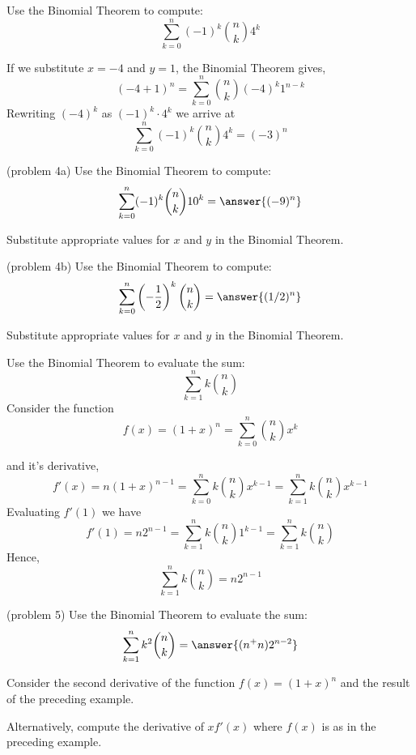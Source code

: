 \documentclass[handout]{ximera}
\begin{document}
\begin{example}[example 4]
Use the Binomial Theorem to compute:
\[
\sum_{k=0}^n (-1)^k\binom{n}{k}4^k 
\]

If we substitute $x=-4$ and $y=1$, the Binomial Theorem gives,
\[
(-4+1)^n = \sum_{k=0}^n \binom{n}{k} (-4)^k 1^{n-k}
\]
Rewriting $(-4)^k$ as $(-1)^k \cdot 4^k$ we arrive at
\[
\sum_{k=0}^n (-1)^k\binom{n}{k}4^k = (-3)^n
\]
\end{example}

\begin{problem}(problem 4a)
Use the Binomial Theorem to compute:
\[
\sum_{k=0}^n (-1)^k\binom{n}{k}10^k = \answer{(-9)^n}
\]
\begin{hint}
Substitute appropriate values for $x$ and $y$ in the Binomial Theorem.
\end{hint}

\end{problem}

\begin{problem}(problem 4b)
Use the Binomial Theorem to compute:
\[
\sum_{k=0}^n \left(-\frac12\right)^k\binom{n}{k} = \answer{(1/2)^n}
\]
\begin{hint}
Substitute appropriate values for $x$ and $y$ in the Binomial Theorem.
\end{hint}

\end{problem}

\begin{example}[example 5]
Use the Binomial Theorem to evaluate the sum:
\[
\sum_{k=1}^{n} k\binom{n}{k}
\]
Consider the function 
\[
f(x) = (1+x)^n =\sum_{k=0}^n \binom{n}{k} x^k
\]

and it's derivative, 
\[
f'(x) = n(1+x)^{n-1}= \sum_{k=0}^n k\binom{n}{k} x^{k-1} = \sum_{k=1}^n k\binom{n}{k} x^{k-1}
\]
Evaluating $f'(1)$ we have
\[
f'(1) = n2^{n-1} = \sum_{k=1}^n k\binom{n}{k} 1^{k-1} = \sum_{k=1}^n k\binom{n}{k}
\]
Hence,
\[
\sum_{k=1}^n k\binom{n}{k} = n2^{n-1}
\]
\end{example}

\begin{problem}(problem 5)
Use the Binomial Theorem to evaluate the sum:
\[
 \sum_{k=1}^n k^2 \binom {n}{k} = \answer{(n^+n)2^{n-2}}
\]
\begin{hint}
Consider the second derivative of the function $f(x) = (1+x)^n$ and the result of the preceding example.
\end{hint}
\begin{hint}
Alternatively, compute the derivative of $xf'(x)$ where $f(x)$ is as in the preceding example.
\end{hint}

\end{problem}
\end{document}
